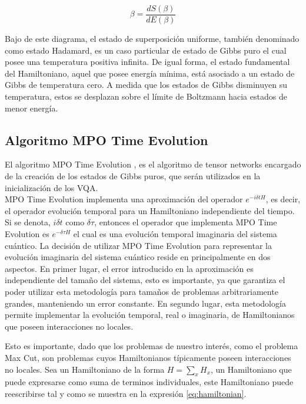 \begin{equation}
  \beta = \frac{d S(\beta)}{d E(\beta)}
  \label{eq:temperature}
\end{equation}

Bajo de este diagrama, el estado de superposición uniforme, también denominado como estado Hadamard, es un caso particular de estado de Gibbs puro el cual posee una temperatura positiva infinita. De igual forma, el estado fundamental del Hamiltoniano, aquel que posee energía mínima, está asociado a un estado de Gibbs de temperatura cero. A medida que los estados de Gibbs disminuyen su temperatura, estos se desplazan sobre el límite de Boltzmann hacia estados de menor energía.

\subsection{Algoritmo MPO Time Evolution}

El algoritmo MPO Time Evolution \citep{zaletel}, es el algoritmo de tensor networks encargado de la creación de los estados de Gibbs puros, que serán utilizados en la inicialización de los VQA.\\

MPO Time Evolution implementa una aproximación del operador $e^{- i \delta t H}$, es decir, el operador evolución temporal para un Hamiltoniano independiente del tiempo. Si se denota, $i \delta t$ como $\delta\tau$, entonces el operador que implementa MPO Time Evolution es $e^{- \delta \tau H}$ el cual es una evolución temporal imaginaria del sistema cuántico. La decisión de utilizar MPO Time Evolution para representar la evolución imaginaria del sistema cuántico reside en principalmente en dos aspectos. En primer lugar, el error introducido en la aproximación es independiente del tamaño del sistema, esto es importante, ya que garantiza el poder utilizar esta metodología para tamaños de problemas arbitrariamente grandes, manteniendo un error constante. En segundo lugar, esta metodología permite implementar la evolución temporal, real o imaginaria, de Hamiltonianos que poseen interacciones no locales. 

\newpage

Esto es importante, dado que los problemas de nuestro interés, como el problema Max Cut, son problemas cuyos Hamiltonianos típicamente poseen interacciones no locales. Sea un Hamiltoniano de la forma $H = \sum_{x} H_{x}$, un Hamiltoniano que puede expresarse como suma de terminos individuales, este Hamiltoniano puede reescribirse tal y como se muestra en la expresión \ref{eq:hamiltonian}.

